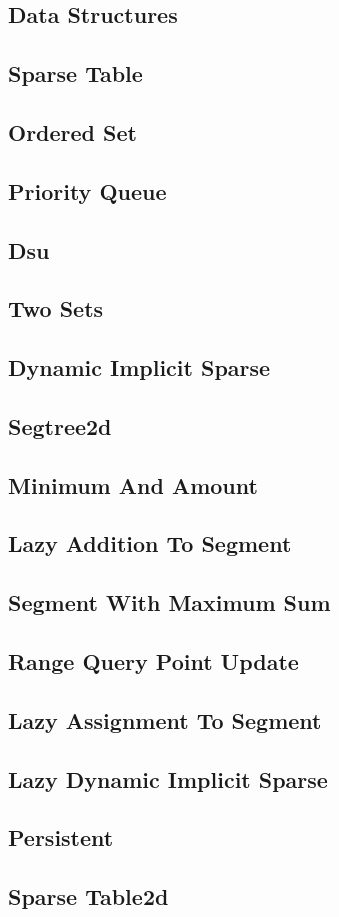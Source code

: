 \documentclass{article}
\newcommand\includes[2]{ %
   \subsection{#1}
   
}
\begin{document}
\begin{multicols}{2}
\section{Data Structures}
\includes{Sparse Table}{Code/Data Structures/sparse_table.cpp}
\includes{Ordered Set}{Code/Data Structures/ordered_set.cpp}
\includes{Priority Queue}{Code/Data Structures/priority_queue.cpp}
\includes{Dsu}{Code/Data Structures/dsu.cpp}
\includes{Two Sets}{Code/Data Structures/two_sets.cpp}
\includes{Dynamic Implicit Sparse}{Code/Data Structures/Segtree/dynamic_implicit_sparse.cpp}
\includes{Segtree2d}{Code/Data Structures/Segtree/segtree2D.cpp}
\includes{Minimum And Amount}{Code/Data Structures/Segtree/minimum_and_amount.cpp}
\includes{Lazy Addition To Segment}{Code/Data Structures/Segtree/lazy_addition_to_segment.cpp}
\includes{Segment With Maximum Sum}{Code/Data Structures/Segtree/segment_with_maximum_sum.cpp}
\includes{Range Query Point Update}{Code/Data Structures/Segtree/range_query_point_update.cpp}
\includes{Lazy Assignment To Segment}{Code/Data Structures/Segtree/lazy_assignment_to_segment.cpp}
\includes{Lazy Dynamic Implicit Sparse}{Code/Data Structures/Segtree/lazy_dynamic_implicit_sparse.cpp}
\includes{Persistent}{Code/Data Structures/Segtree/persistent.cpp}
\includes{Sparse Table2d}{Code/Data Structures/sparse_table2D.cpp}

\end{multicols}
\end{document}
